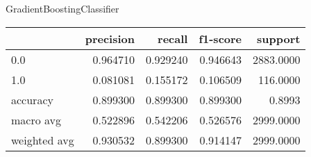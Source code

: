 GradientBoostingClassifier
\begin{tabular}{lrrrr}
\toprule
{} &  precision &    recall &  f1-score &    support \\
\midrule
0.0          &   0.964710 &  0.929240 &  0.946643 &  2883.0000 \\
1.0          &   0.081081 &  0.155172 &  0.106509 &   116.0000 \\
accuracy     &   0.899300 &  0.899300 &  0.899300 &     0.8993 \\
macro avg    &   0.522896 &  0.542206 &  0.526576 &  2999.0000 \\
weighted avg &   0.930532 &  0.899300 &  0.914147 &  2999.0000 \\
\bottomrule
\end{tabular}
